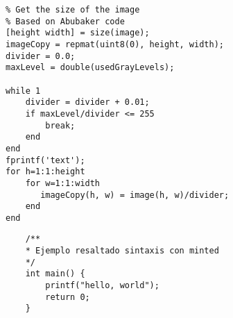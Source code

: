 

\begin{verbatim}
% Get the size of the image
% Based on Abubaker code
[height width] = size(image);
imageCopy = repmat(uint8(0), height, width);
divider = 0.0;
maxLevel = double(usedGrayLevels);

while 1
    divider = divider + 0.01;
    if maxLevel/divider <= 255
        break;
    end
end
fprintf('text');
for h=1:1:height
    for w=1:1:width
       imageCopy(h, w) = image(h, w)/divider;
    end
end
\end{verbatim}

\begin{verbatim}
    /**
    * Ejemplo resaltado sintaxis con minted
    */
    int main() {
        printf("hello, world");
        return 0;
    }
\end{verbatim}
